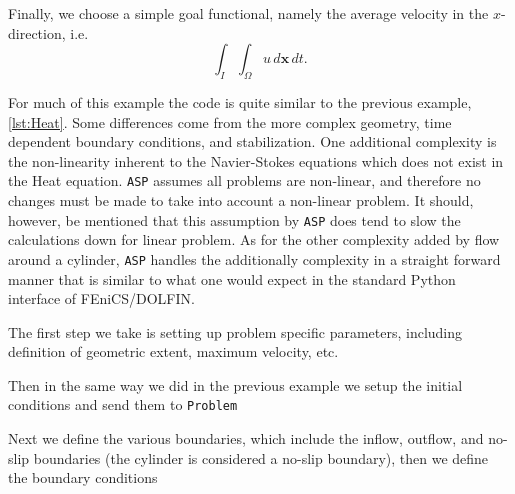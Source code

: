     Finally, we choose a simple goal functional, namely the average velocity in
    the $x$-direction, i.e.
    \begin{equation}
        \int_{I}\!\int_{\Omega} u\, d\mathbf{x}\,dt.
        \label{eq:NSEGoal}
    \end{equation}

    For much of this example the code is quite similar to the previous example,
    \autoref{lst:Heat}.  Some differences come from the more complex geometry,
    time dependent boundary conditions, and stabilization. One additional
    complexity is the non-linearity inherent to the Navier-Stokes equations
    which does not exist in the Heat equation. \texttt{ASP} assumes all problems
    are non-linear, and therefore no changes must be made to take into account a
    non-linear problem.  It should, however, be mentioned that this assumption
    by \texttt{ASP} does tend to slow the calculations down for linear problem.
    As for the other complexity added by flow around a cylinder, \texttt{ASP}
    handles the additionally complexity in a straight forward manner that is
    similar to what one would expect in the standard Python interface of
    FEniCS/DOLFIN.

    The first step we take is setting up problem specific parameters, including
    definition of geometric extent, maximum velocity, etc.
    
    
    Then in the same way we did in the previous example we setup the initial
    conditions and send them to \texttt{Problem}
    
    

    Next we define the various boundaries, which include the inflow, outflow,
    and no-slip boundaries (the cylinder is considered a no-slip boundary), then
    we define the boundary conditions
    
    

